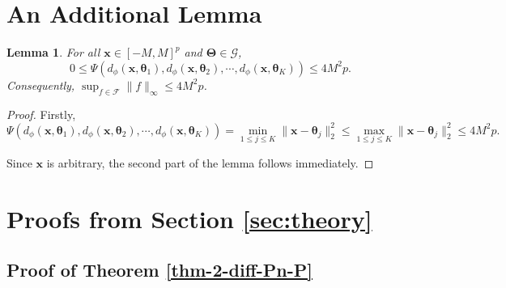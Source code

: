 \documentclass[11pt]{article}
\newtheorem{lemma}{Lemma}[section]
\begin{document}
\appendix


\section{An Additional Lemma}

\begin{lemma}\label{lemma-bound-Psi}
    For all $\bm{x}\in [-M,M]^p$ and $\bm{\Theta}\in \mathscr{G}$, \[0\le \Psi(d_{\phi}(\bm{x},\bm{\theta}_1), d_{\phi}(\bm{x},\bm{\theta}_2),\cdots, d_{\phi}(\bm{x},\bm{\theta}_K) )\le 4M^2p.\]
    Consequently, $\sup_{f\in \mathcal{F}}\|f\|_{\infty}\le 4M^2p$.
\end{lemma}

\begin{proof}
    Firstly,
    \begin{equation*}
        \Psi(d_{\phi}(\bm{x},\bm{\theta}_1), d_{\phi}(\bm{x},\bm{\theta}_2),\cdots, d_{\phi}(\bm{x},\bm{\theta}_K) ) = \min_{1\le j\le K}\|\bm{x}-\bm{\theta}_j\|_2^2 \le \max_{1\le j\le K}\|\bm{x}-\bm{\theta}_j\|_2^2 \le 4M^2p.
    \end{equation*}

    Since $\bm{x}$ is arbitrary, the second part of the lemma follows immediately.
\end{proof}

\section{Proofs from Section \ref{sec:theory}}


\subsection{Proof of Theorem \ref{thm-2-diff-Pn-P}}
\end{document}
